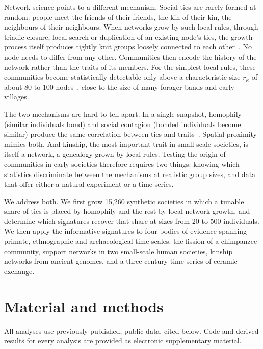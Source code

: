 \documentclass[11pt]{article}
\begin{document}
Network science points to a different mechanism. Social ties are rarely formed at random: people meet
the friends of their friends, the kin of their kin, the neighbours of their neighbours. When networks
grow by such local rules, through triadic closure, local search or duplication of an existing node's
ties, the growth process itself produces tightly knit groups loosely connected to each
other~\cite{Jin2001,Vazquez2003,Toivonen2006}. No node needs to differ from any other. Communities then
encode the history of the network rather than the traits of its members. For the simplest local rules,
these communities become statistically detectable only above a characteristic size $r_\kappa$ of about
80 to 100 nodes~\cite{VazquezBook}, close to the size of many forager bands and early villages.

The two mechanisms are hard to tell apart. In a single snapshot, homophily (similar individuals bond)
and social contagion (bonded individuals become similar) produce the same correlation between ties and
traits~\cite{Shalizi2011}. Spatial proximity mimics both. And kinship, the most important trait in
small-scale societies, is itself a network, a genealogy grown by local rules. Testing the origin of
communities in early societies therefore requires two things: knowing which statistics discriminate
between the mechanisms at realistic group sizes, and data that offer either a natural experiment or a
time series.

We address both. We first grow 15,260 synthetic societies in which a tunable share of ties is placed by
homophily and the rest by local network growth, and determine which signatures recover that share at
sizes from 20 to 500 individuals. We then apply the informative signatures to four bodies of evidence
spanning primate, ethnographic and archaeological time scales: the fission of a chimpanzee community,
support networks in two small-scale human societies, kinship networks from ancient genomes, and a
three-century time series of ceramic exchange.

\section{Material and methods}

All analyses use previously published, public data, cited below. Code and derived results for every
analysis are provided as electronic supplementary material.
\end{document}
